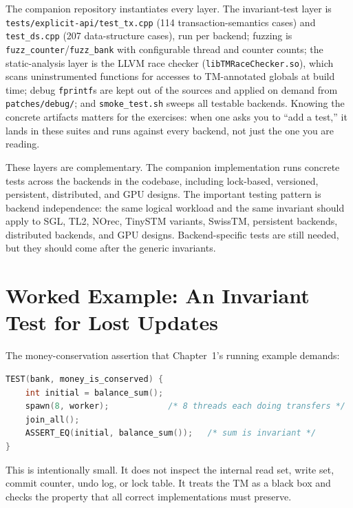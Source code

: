 The companion repository instantiates every layer. The invariant-test layer
is \texttt{tests/\allowbreak explicit-api/\allowbreak test\_tx.cpp} (114 transaction-semantics cases)
and \texttt{test\_ds.cpp} (207 data-structure cases), run per backend;
fuzzing is \texttt{fuzz\_counter}/\texttt{\allowbreak fuzz\_bank} with configurable
thread and counter counts; the static-analysis layer is the LLVM race
checker (\texttt{libTMRaceChecker.so}), which scans uninstrumented functions
for accesses to TM-annotated globals at build time; debug
\texttt{fprintf}s are kept out of the sources and applied on demand from
\texttt{patches/debug/}; and \texttt{smoke\_test.sh} sweeps all testable
backends. Knowing the concrete artifacts matters for the exercises: when one
asks you to ``add a test,'' it lands in these suites and runs against every
backend, not just the one you are reading.

These layers are complementary. The companion implementation runs concrete tests across the backends in the codebase, including lock-based, versioned, persistent, distributed, and GPU designs. The important testing pattern is backend independence: the same logical workload and the same invariant should apply to SGL, TL2, NOrec, TinySTM variants, SwissTM, persistent backends, distributed backends, and GPU designs. Backend-specific tests are still needed, but they should come after the generic invariants.

\section{Worked Example: An Invariant Test for Lost Updates}
\label{sec:test-example}

The money-conservation assertion that Chapter~1's running example demands:

\begin{lstlisting}[language=C, caption={An invariant test for the transfer benchmark.}]
TEST(bank, money_is_conserved) {
    int initial = balance_sum();
    spawn(8, worker);            /* 8 threads each doing transfers */
    join_all();
    ASSERT_EQ(initial, balance_sum());   /* sum is invariant */
}
\end{lstlisting}

This is intentionally small. It does not inspect the internal read set, write set, commit counter, undo log, or lock table. It treats the TM as a black box and checks the property that all correct implementations must preserve.

